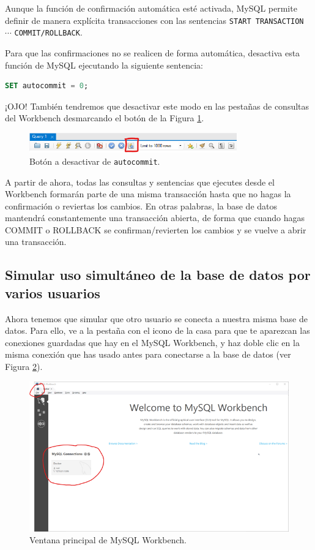 \documentclass{db-practice}
\begin{document}
Aunque la función de confirmación automática esté activada, MySQL permite definir de manera explícita transacciones con las sentencias \texttt{START TRANSACTION} $\cdots$ \texttt{COMMIT/ROLLBACK}.

Para que las confirmaciones no se realicen de forma automática, desactiva esta función de MySQL ejecutando la siguiente sentencia:

\begin{lstlisting}[language=SQL]
SET autocommit = 0;
\end{lstlisting}

¡OJO! También tendremos que desactivar este modo en las pestañas de consultas del Workbench desmarcando el botón de la Figura \ref{fig:autoejecución}.

\begin{figure}[ht]
    \centering
    \includegraphics[width=0.8\textwidth]{figs/autoejecucion.png}
    \caption{Botón a desactivar de \texttt{autocommit}.}\label{fig:autoejecución}
\end{figure}

A partir de ahora, todas las consultas y sentencias que ejecutes desde el Workbench formarán parte de una misma transacción hasta que no hagas la confirmación o reviertas los cambios. En otras palabras, la base de datos mantendrá constantemente una transacción abierta, de forma que cuando hagas COMMIT o ROLLBACK se confirman/revierten los cambios y se vuelve a abrir una transacción.

\subsection*{Simular uso simultáneo de la base de datos por varios usuarios}

Ahora tenemos que simular que otro usuario se conecta a nuestra misma base de datos. Para ello, ve a la pestaña con el icono de la casa para que te aparezcan las conexiones guardadas que hay en el MySQL Workbench, y haz doble clic en la misma conexión que has usado antes para conectarse a la base de datos (ver Figura \ref{fig:mysqlwork}).

\begin{figure}[ht]
    \centering
    \includegraphics[width=0.9\columnwidth]{figs/mysqlwork.png}
    \caption{Ventana principal de MySQL Workbench.}\label{fig:mysqlwork}
\end{figure}
\end{document}
